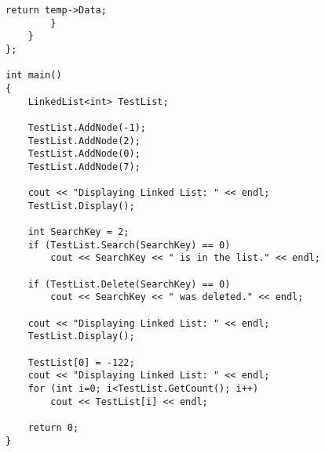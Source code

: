 \documentclass[12pt,a4paper]{article}
\begin{document}
\begin{lstlisting}[caption={Linked List Template},escapechar=$]
			return temp->Data;
		}
	}
};

int main()
{
	LinkedList<int> TestList;

	TestList.AddNode(-1);
	TestList.AddNode(2);
	TestList.AddNode(0);
	TestList.AddNode(7);

	cout << "Displaying Linked List: " << endl;
	TestList.Display();

	int SearchKey = 2;
	if (TestList.Search(SearchKey) == 0)
		cout << SearchKey << " is in the list." << endl;

	if (TestList.Delete(SearchKey) == 0)
		cout << SearchKey << " was deleted." << endl;

	cout << "Displaying Linked List: " << endl;
	TestList.Display();
	
	TestList[0] = -122;
	cout << "Displaying Linked List: " << endl;
	for (int i=0; i<TestList.GetCount(); i++)
		cout << TestList[i] << endl;

	return 0;
}
\end{lstlisting}


\end{document}
